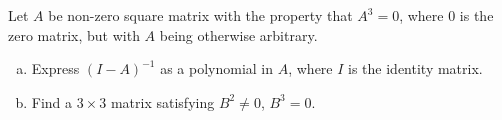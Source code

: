 Let $A$ be non-zero square matrix with the property that $A^3 = 0$, where $0$
is the zero matrix, but with $A$ being otherwise arbitrary.

\begin{enumerate}[(a)]

\item Express $(I - A)^{-1}$ as a polynomial in $A$, where $I$ is the identity
      matrix.
\item Find a $3 \times 3$ matrix satisfying $B^2 \ne 0$, $B^3 = 0$.

\end{enumerate}
